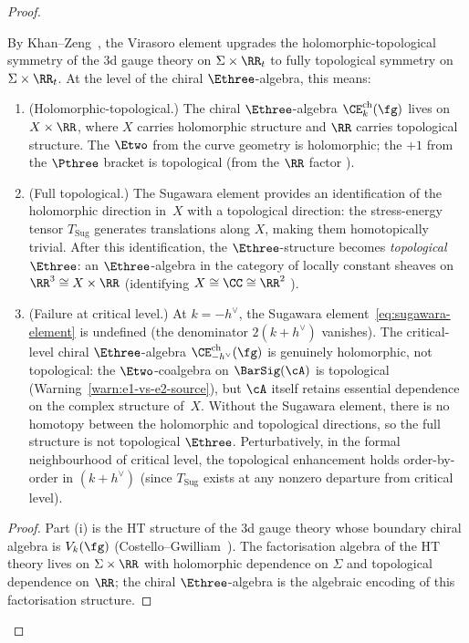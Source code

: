 \begin{proof}
\begin{proposition}
By Khan--Zeng~\cite{KhanZeng25}, the Virasoro element
upgrades the holomorphic-topological symmetry of the $3$d
gauge theory on $\Sigma \times \RR_t$ to fully topological
symmetry on $\Sigma \times \RR_t$. At the level of the
chiral $\Ethree$-algebra, this means:
\begin{enumerate}[label=\textup{(\roman*)}]
\item \textup{(Holomorphic-topological.)}
  The chiral $\Ethree$-algebra
  $\CE^{\mathrm{ch}}_k(\fg)$ lives on $X \times \RR$,
  where $X$ carries holomorphic structure and $\RR$
  carries topological structure. The $\Etwo$ from the
  curve geometry is holomorphic; the $+1$ from the $\Pthree$
  bracket is topological \textup{(}from the $\RR$ factor%
  \textup{)}.
\item \textup{(Full topological.)}
  The Sugawara element provides an identification
  of the holomorphic direction in~$X$ with a topological
  direction: the stress-energy tensor $T_{\mathrm{Sug}}$
  generates translations along $X$, making them homotopically
  trivial. After this identification, the
  $\Ethree$-structure becomes \emph{topological} $\Ethree$:
  an $\Ethree$-algebra in the category of locally constant
  sheaves on $\RR^3 \cong X \times \RR$
  \textup{(}identifying $X \cong \CC \cong \RR^2$%
  \textup{)}.
\item \textup{(Failure at critical level.)}
  At $k = -h^\vee$, the Sugawara element~\eqref{eq:sugawara-element}
  is undefined \textup{(}the denominator $2(k+h^\vee)$
  vanishes\textup{)}. The critical-level chiral
  $\Ethree$-algebra $\CE^{\mathrm{ch}}_{-h^\vee}(\fg)$ is
  genuinely holomorphic, not topological: the
  $\Etwo$-coalgebra on $\BarSig(\cA)$ is topological
  (Warning~\ref{warn:e1-vs-e2-source}), but $\cA$
  itself retains essential dependence on the complex
  structure of~$X$.
  Without the Sugawara element, there is no homotopy
  between the holomorphic and topological directions,
  so the full structure is not topological $\Ethree$.
  Perturbatively, in the formal neighbourhood of critical level,
  the topological enhancement holds order-by-order in
  $(k + h^\vee)$ \textup{(}since $T_{\mathrm{Sug}}$ exists at
  any nonzero departure from critical level\textup{)}.
\end{enumerate}
\end{proposition}

\begin{proof}
Part (i) is the HT structure of the $3$d gauge theory
whose boundary chiral algebra is $V_k(\fg)$
(Costello--Gwilliam~\cite{CG17}). The factorisation
algebra of the HT theory lives on $\Sigma \times \RR$
with holomorphic dependence on $\Sigma$ and topological
dependence on $\RR$; the chiral $\Ethree$-algebra is the
algebraic encoding of this factorisation structure.


\end{proof}
\end{proof}
